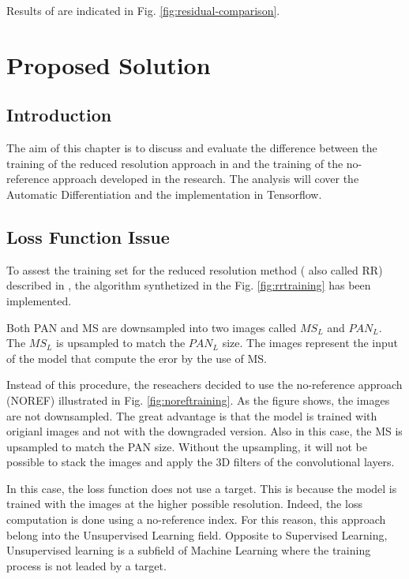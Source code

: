 \documentclass[12pt]{report}
\begin{document}
Results of \cite{residual4} are indicated in Fig. \ref{fig:residual-comparison}.

\newpage

\chapter{Proposed Solution}

\section{Introduction}

The aim of this chapter is to discuss and evaluate the difference between the training of the reduced resolution approach in \cite{pnn}
and the training of the no-reference approach developed in the research.
The analysis will cover the Automatic Differentiation and the implementation in Tensorflow.

\section{Loss Function Issue}
\label{sec:lossfunction}
To assest the training set for the reduced resolution method ( also called RR) described in \cite{pnn} ,
the algorithm synthetized in the Fig. \ref{fig:rrtraining} has been implemented.

Both PAN and MS are downsampled into two images called $MS_L$ and $PAN_L$.
The $MS_L$ is upsampled to match the $PAN_L$ size.
The images represent the input of the model that compute the eror by the use of MS.

Instead of this procedure, the reseachers decided to use the no-reference approach (NOREF) illustrated in Fig. \ref{fig:noreftraining}.
As the figure shows, the images are not downsampled. The great advantage is that 
the model is trained with origianl images and not with the downgraded version.
Also in this case, the MS is upsampled to match the PAN size.
Without the upsampling, it will not be possible to stack the images and apply the 3D filters of the convolutional layers.

In this case, the loss function does not use a target.
This is because the model is trained with the images at the higher possible resolution.
Indeed, the loss computation is done using a no-reference index.
For this reason, this approach belong into the Unsupervised Learning field.
Opposite to Supervised Learning, Unsupervised learning is a subfield of Machine Learning where the training process is not leaded by a target.
\end{document}
